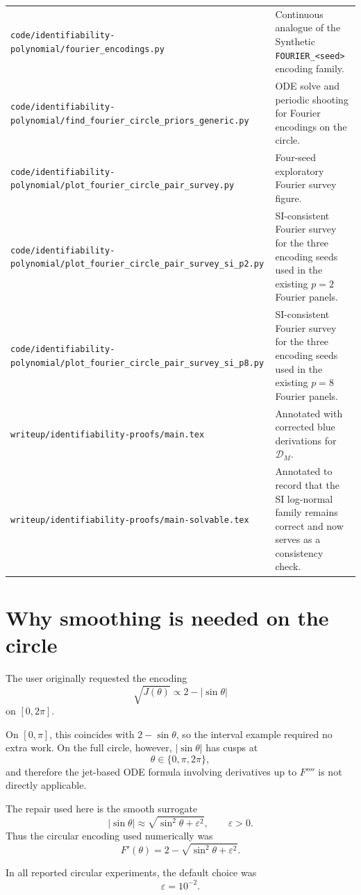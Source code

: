 \documentclass[11pt]{article}
\begin{document}
\begin{longtable}{p{}p{}}
\texttt{code/identifiability-polynomial/fourier\_encodings.py} & Continuous analogue of the Synthetic \texttt{FOURIER\_<seed>} encoding family. \\
\texttt{code/identifiability-polynomial/find\_fourier\_circle\_priors\_generic.py} & ODE solve and periodic shooting for Fourier encodings on the circle. \\
\texttt{code/identifiability-polynomial/plot\_fourier\_circle\_pair\_survey.py} & Four-seed exploratory Fourier survey figure. \\
\texttt{code/identifiability-polynomial/plot\_fourier\_circle\_pair\_survey\_si\_p2.py} & SI-consistent Fourier survey for the three encoding seeds used in the existing $p=2$ Fourier panels. \\
\texttt{code/identifiability-polynomial/plot\_fourier\_circle\_pair\_survey\_si\_p8.py} & SI-consistent Fourier survey for the three encoding seeds used in the existing $p=8$ Fourier panels. \\
\texttt{writeup/identifiability-proofs/main.tex} & Annotated with corrected blue derivations for $\mathcal{D}_M$. \\
\texttt{writeup/identifiability-proofs/main-solvable.tex} & Annotated to record that the SI log-normal family remains correct and now serves as a consistency check. \\
\bottomrule
\end{longtable}

\section{Why smoothing is needed on the circle}

The user originally requested the encoding
\[
\sqrt{J(\theta)} \propto 2-|\sin\theta|
\]
on $[0,2\pi]$.

On $[0,\pi]$, this coincides with $2-\sin\theta$, so the interval example required no extra work. On the full circle, however, $|\sin\theta|$ has cusps at
\[
\theta \in \{0,\pi,2\pi\},
\]
and therefore the jet-based ODE formula involving derivatives up to $F''''$ is not directly applicable.

The repair used here is the smooth surrogate
\[
|\sin\theta| \approx \sqrt{\sin^2\theta+\varepsilon^2},
\qquad \varepsilon>0.
\]
Thus the circular encoding used numerically was
\[
F'(\theta)=2-\sqrt{\sin^2\theta+\varepsilon^2}.
\]

In all reported circular experiments, the default choice was
\[
\varepsilon = 10^{-2}.
\]
\end{document}
